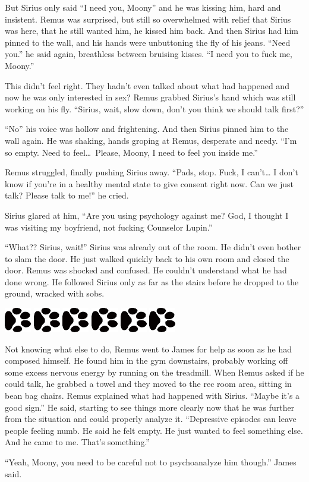 \documentclass[12pt,twoside,openright]{memoir}
\newcommand{\dogPrintRule}{	
	\begin{center}
		\hspace{.5em}
		\includegraphics[angle=60]{dogprint.pdf}
		\hspace{.5em}
		\includegraphics[angle=120]{dogprint.pdf}
		\hspace{.5em}
		\includegraphics[angle=60]{dogprint.pdf}
		\hspace{.5em}
		\includegraphics[angle=120]{dogprint.pdf}
		\hspace{.5em}
		\includegraphics[angle=60]{dogprint.pdf}
		\hspace{.5em}
		\includegraphics[angle=120]{dogprint.pdf}
		\hspace{.5em}
	\end{center}
}
\begin{document}
But Sirius only said ``I need you, Moony'' and he was kissing him, hard and insistent. Remus was surprised, but still so overwhelmed with relief that Sirius was here, that he still wanted him, he kissed him back. And then Sirius had him pinned to the wall, and his hands were unbuttoning the fly of his jeans. ``Need you.'' he said again, breathless between bruising kisses. ``I need you to fuck me, Moony.''

This didn't feel right. They hadn't even talked about what had happened and now he was only interested in sex? Remus grabbed Sirius's hand which was still working on his fly. ``Sirius, wait, slow down, don't you think we should talk first?''

``No'' his voice was hollow and frightening. And then Sirius pinned him to the wall again. He was shaking, hands groping at Remus, desperate and needy. ``I'm so empty. Need to feel\ldots\ Please, Moony, I need to feel you inside me.'' 

Remus struggled, finally pushing Sirius away. ``Pads, stop. Fuck, I can't… I don't know if you're in a healthy mental state to give consent right now. Can we just talk? Please talk to me!'' he cried. 

Sirius glared at him, ``Are you using psychology against me? God, I thought I was visiting my boyfriend, not fucking Counselor Lupin.'' 

``What?? Sirius, wait!'' Sirius was already out of the room. He didn't even bother to slam the door. He just walked quickly back to his own room and closed the door. Remus was shocked and confused. He couldn't understand what he had done wrong. He followed Sirius only as far as the stairs before he dropped to the ground, wracked with sobs. 

\dogPrintRule

Not knowing what else to do, Remus went to James for help as soon as he had composed himself. He found him in the gym downstairs, probably working off some excess nervous energy by running on the treadmill. When Remus asked if he could talk, he grabbed a towel and they moved to the rec room area, sitting in bean bag chairs. Remus explained what had happened with Sirius. ``Maybe it's a good sign.'' He said, starting to see things more clearly now that he was further from the situation and could properly analyze it. ``Depressive episodes can leave people feeling numb. He said he felt empty. He just wanted to feel something else. And he came to me. That's something.''

``Yeah, Moony, you need to be careful not to psychoanalyze him though.'' James said.
\end{document}
